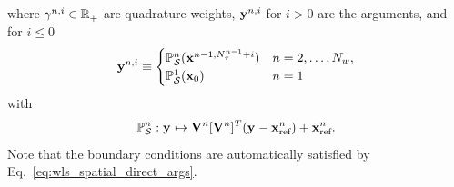 where $\gamma^{n,i} \in \mathbb{R}^{}_{+}$ are quadrature weights, $\mathbf{y}^{n,i}$ for $i>0$ are the arguments, and for $i \le 0$
\begin{equation}\label{eq:wls_spatial_direct_args}
\mathbf{y}^{n,i}  \equiv 
\begin{cases}
\mathbb{P}_{\mathcal{S}}^{n}(\tilde{\mathbf{x}}^{n-1,N_{\tau}^{n-1}+i})  & n = 2,\ldots,N_w,  \\
\mathbb{P}_{\mathcal{S}}^{1}({{\mathbf{x}}_0})  & n = 1  \\
\end{cases}
\end{equation}
with 
$$\mathbb{P}_{\mathcal{S}}^{n} : \mathbf{y}^{} \mapsto  \mathbf {V}^{n}[\mathbf {V}^{n}]^T (\mathbf{y}^{} - \mathbf{x}_\text{ref}^{n}) + \mathbf{x}_\text{ref}^{n} .$$
Note that the boundary conditions are automatically satisfied by Eq.~\eqref{eq:wls_spatial_direct_args}.

